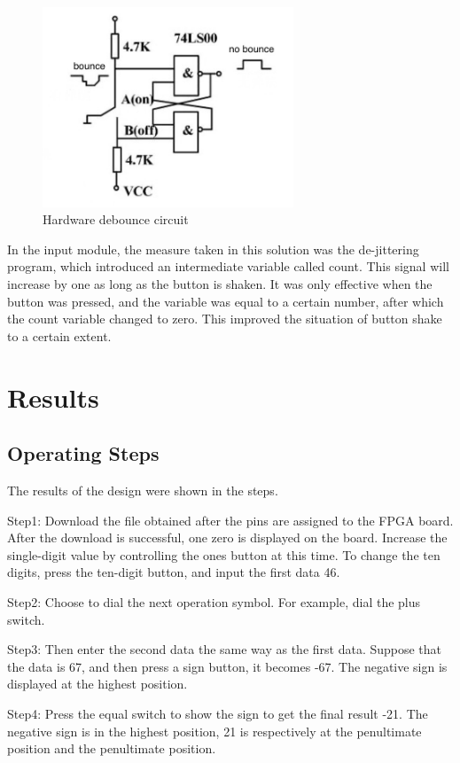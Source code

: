 \documentclass[11pt,journal,compsoc]{IEEEtran}
\begin{document}
\begin{figure}[H]
	\centering
	\includegraphics[width=7.5cm]{fig8}
	\caption{Hardware debounce circuit}
	\label{Fig5}
\end{figure}

In the input module, the measure taken in this solution was the de-jittering program, which introduced an intermediate variable called count. This signal will increase by one as long as the button is shaken. It was only effective when the button was pressed, and the variable was equal to a certain number, after which the count variable changed to zero. This improved the situation of button shake to a certain extent.

\section{Results}
\subsection{Operating Steps}
The results of the design were shown in the steps.

Step1: Download the file obtained after the pins are assigned to the FPGA board. After the download is successful, one zero is displayed on the board. Increase the single-digit value by controlling the ones button at this time. To change the ten digits, press the ten-digit button, and input the first data 46.

Step2: Choose to dial the next operation symbol. For example, dial the plus switch.

Step3: Then enter the second data the same way as the first data. Suppose that the data is 67, and then press a sign button, it becomes -67. The negative sign is displayed at the highest position.

Step4: Press the equal switch to show the sign to get the final result -21. The negative sign is in the highest position, 21 is respectively at the penultimate position and the penultimate position.
\end{document}
